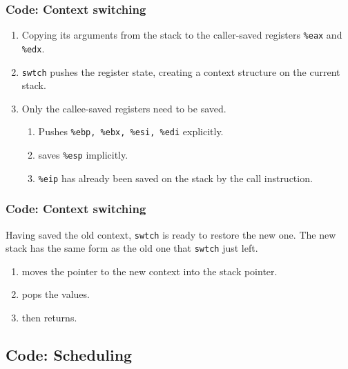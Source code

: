 \documentclass{beamer}
\begin{document}
\begin{frame}[t]
  \frametitle{Code: Context switching}
  

  \begin{enumerate}
  \item Copying its arguments from the stack to the caller-saved registers \texttt{\%eax} and \texttt{\%edx}.
  \item \texttt{swtch} pushes the register state, creating a context structure on the current stack.
  \item Only the callee-saved registers need to be saved.
    \begin{enumerate}
    \item Pushes \texttt{\%ebp, \%ebx, \%esi, \%edi} explicitly.
    \item saves \texttt{\%esp} implicitly.
    \item \texttt{\%eip} has already been saved on the stack by the call instruction.
    \end{enumerate}
  \end{enumerate}
  
\end{frame}


\begin{frame}[t]
  \frametitle{Code: Context switching}
  Having saved the old context, \texttt{swtch} is ready to restore the new one.
  The new stack has the same form as the old one that \texttt{swtch} just left.
  \begin{enumerate}
  \item moves the pointer to the new context into the stack pointer.
  \item pops the values.
  \item then returns.
  \end{enumerate}
  
\end{frame}


\subsection{Code: Scheduling}

\end{document}
